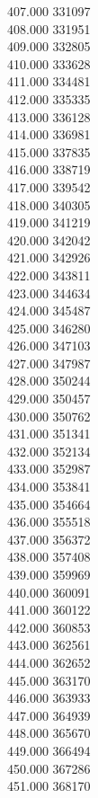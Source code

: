 { 407.000	331097 \\
 408.000	331951 \\
 409.000	332805 \\
 410.000	333628 \\
 411.000	334481 \\
 412.000	335335 \\
 413.000	336128 \\
 414.000	336981 \\
 415.000	337835 \\
 416.000	338719 \\
 417.000	339542 \\
 418.000	340305 \\
 419.000	341219 \\
 420.000	342042 \\
 421.000	342926 \\
 422.000	343811 \\
 423.000	344634 \\
 424.000	345487 \\
 425.000	346280 \\
 426.000	347103 \\
 427.000	347987 \\
 428.000	350244 \\
 429.000	350457 \\
 430.000	350762 \\
 431.000	351341 \\
 432.000	352134 \\
 433.000	352987 \\
 434.000	353841 \\
 435.000	354664 \\
 436.000	355518 \\
 437.000	356372 \\
 438.000	357408 \\
 439.000	359969 \\
 440.000	360091 \\
 441.000	360122 \\
 442.000	360853 \\
 443.000	362561 \\
 444.000	362652 \\
 445.000	363170 \\
 446.000	363933 \\
 447.000	364939 \\
 448.000	365670 \\
 449.000	366494 \\
 450.000	367286 \\
 451.000	368170 \\
}
